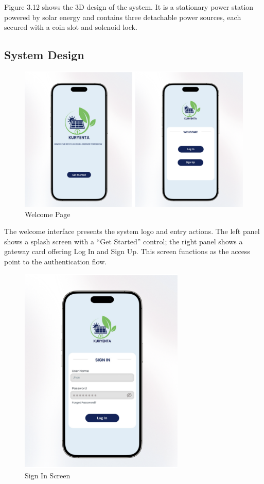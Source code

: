 {Figure 3.12 shows the 3D design of the system. It is a stationary power station powered by solar energy and contains three detachable power sources, each secured with a coin slot and solenoid lock.
  
  \subsection{System Design}
  
     \begin{figure}[H]
  	\centering
  	\caption{Welcome Page}
  	\label{fig:welcome}
  	\includegraphics[width=1\textwidth]{figures/welcome.png}
  \end{figure}
  
  The welcome interface presents the system logo and entry actions. The left panel shows a splash screen with a “Get Started” control; the right panel shows a gateway card offering Log In and Sign Up. This screen functions as the access point to the authentication flow.
  
   \begin{figure}[H]
  	\centering
  	\caption{Sign In Screen}
  	\label{fig:signin}
  	\includegraphics[width=0.7\textwidth]{figures/signin.png}
  \end{figure}
  
}
